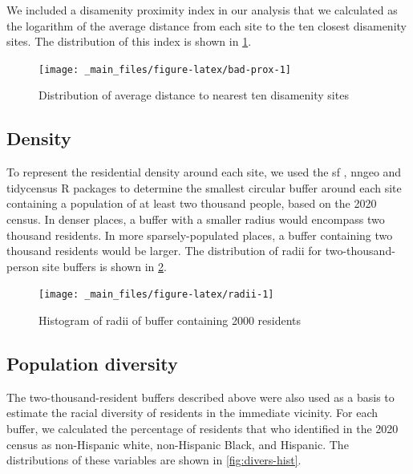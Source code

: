 \documentclass[
]{book}
\begin{document}
We included a disamenity proximity index in our analysis that we calculated
as the logarithm of the average distance from each site to the ten closest
disamenity sites. The distribution of this index is shown in \ref{fig:bad-prox}.

\begin{figure}

{\centering \texttt{[image: \_main\_files/figure-latex/bad-prox-1]} 

}

\caption{Distribution of average distance to nearest ten disamenity sites}\label{fig:bad-prox}
\end{figure}

\hypertarget{density}{%
\subsection{Density}\label{density}}

To represent the residential density around each site, we used the sf \citep{sf}, nngeo
\citep{nngeo} and tidycensus \citep{tidycensus} R packages to determine the smallest circular
buffer around each site containing a population of at least two thousand people,
based on the 2020 census. In denser places, a buffer with a smaller radius would
encompass two thousand residents. In more sparsely-populated places, a buffer
containing two thousand residents would be larger. The distribution of radii for
two-thousand-person site buffers is shown in \ref{fig:radii}.

\begin{figure}

{\centering \texttt{[image: \_main\_files/figure-latex/radii-1]} 

}

\caption{Histogram of radii of buffer containing 2000 residents}\label{fig:radii}
\end{figure}

\hypertarget{population-diversity}{%
\subsection{Population diversity}\label{population-diversity}}

The two-thousand-resident buffers described above were also used as a basis to
estimate the racial diversity of residents in the immediate vicinity. For each
buffer, we calculated the percentage of residents that who identified in the 2020
census as non-Hispanic white, non-Hispanic Black, and Hispanic. The distributions
of these variables are shown in \ref{fig:divers-hist}.
\end{document}
